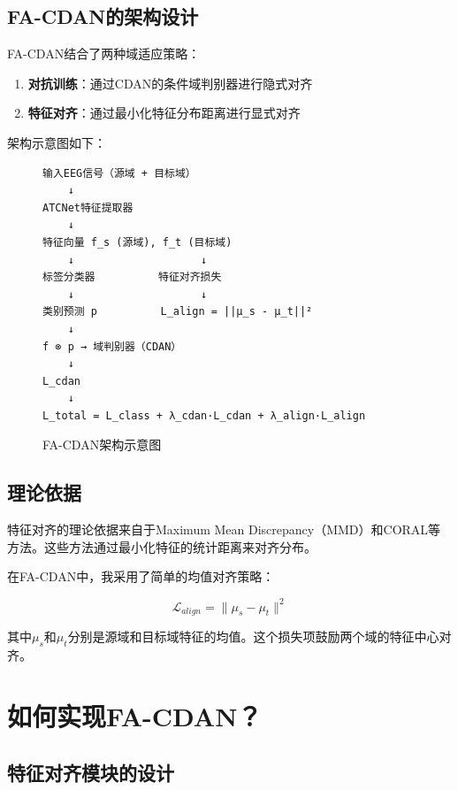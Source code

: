 \documentclass[12pt,a4paper]{ctexart}
\begin{document}
\subsection{FA-CDAN的架构设计}

FA-CDAN结合了两种域适应策略：

\begin{enumerate}
    \item \textbf{对抗训练}：通过CDAN的条件域判别器进行隐式对齐
    \item \textbf{特征对齐}：通过最小化特征分布距离进行显式对齐
\end{enumerate}

架构示意图如下：

\begin{figure}[H]
\centering
\begin{verbatim}
输入EEG信号（源域 + 目标域）
    ↓
ATCNet特征提取器
    ↓
特征向量 f_s (源域), f_t (目标域)
    ↓                    ↓
标签分类器          特征对齐损失
    ↓                    ↓
类别预测 p          L_align = ||μ_s - μ_t||²
    ↓
f ⊗ p → 域判别器（CDAN）
    ↓
L_cdan
    ↓
L_total = L_class + λ_cdan·L_cdan + λ_align·L_align
\end{verbatim}
\caption{FA-CDAN架构示意图}
\label{fig:fa_cdan_arch}
\end{figure}

\subsection{理论依据}

特征对齐的理论依据来自于Maximum Mean Discrepancy（MMD）和CORAL等方法。这些方法通过最小化特征的统计距离来对齐分布。

在FA-CDAN中，我采用了简单的均值对齐策略：

\begin{equation}
\mathcal{L}_{align} = \|\mu_s - \mu_t\|^2
\end{equation}

其中$\mu_s$和$\mu_t$分别是源域和目标域特征的均值。这个损失项鼓励两个域的特征中心对齐。

\section{如何实现FA-CDAN？}

\subsection{特征对齐模块的设计}
\end{document}
